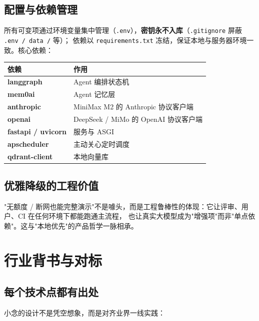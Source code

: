 \section{配置与依赖管理}
所有可变项通过环境变量集中管理（\texttt{.env}），\textbf{密钥永不入库}（\texttt{.gitignore} 屏蔽 \texttt{.env / data /} 等）；
依赖以 \texttt{requirements.txt} 冻结，保证本地与服务器环境一致。核心依赖：

\begin{center}
\small
\begin{tabularx}{\linewidth}{>{\bfseries\ttfamily}p{3cm} X}
\toprule
依赖 & 作用 \\
\midrule
langgraph & Agent 编排状态机 \\
mem0ai & Agent 记忆层 \\
anthropic & MiniMax M2 的 Anthropic 协议客户端 \\
openai & DeepSeek / MiMo 的 OpenAI 协议客户端 \\
fastapi / uvicorn & 服务与 ASGI \\
apscheduler & 主动关心定时调度 \\
qdrant-client & 本地向量库 \\
\bottomrule
\end{tabularx}
\end{center}

\section{优雅降级的工程价值}
"无额度 / 断网也能完整演示"不是噱头，而是工程鲁棒性的体现：它让评审、用户、CI 在任何环境下都能跑通主流程，
也让真实大模型成为"增强项"而非"单点依赖"。这与"本地优先"的产品哲学一脉相承。


\chapter{行业背书与对标}

\section{每个技术点都有出处}
小念的设计不是凭空想象，而是对齐业界一线实践：


